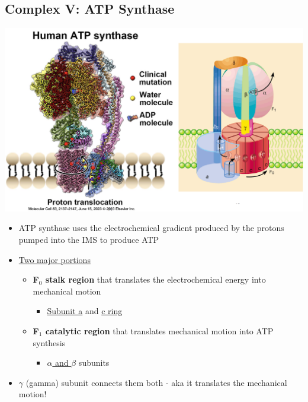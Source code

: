\documentclass[10pt]{article}
\begin{document}
\subsection*{Complex V: ATP Synthase}
\begin{center} 
	\includegraphics*[width=\textwidth]{L2_24.png} 
\end{center}
\begin{itemize}
	\item ATP synthase uses the electrochemical gradient produced by the protons pumped into the IMS to produce ATP
	\item \underline{Two major portions}
	\begin{itemize}
        \item \textbf{F$_0$ stalk region} that translates the electrochemical energy into mechanical motion
        \begin{itemize}
            \item \underline{Subunit a} and \underline{c ring}
        \end{itemize}
        \item \textbf{F$_1$ catalytic region} that translates mechanical motion into ATP synthesis
        \begin{itemize}
            \item \underline{$\alpha$ and $\beta$} subunits
        \end{itemize}
    \end{itemize}
    \item $\gamma$ (gamma) subunit connects them both - aka it translates the mechanical motion!
\end{itemize}
\end{document}

